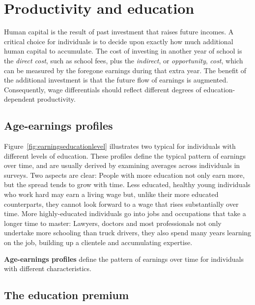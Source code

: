 \section{Productivity and education}\label{sec:ch13sec2}

Human capital is the result of past investment that raises future incomes. A
critical choice for individuals is to decide upon exactly how much
additional human capital to accumulate. The cost of investing in another
year of school is the \textit{direct cost}, such as school fees, plus the 
\textit{indirect}, or \textit{opportunity}, \textit{cost}, which can be measured by the
foregone earnings during that extra year. The benefit of the additional
investment is that the future flow of earnings is augmented. Consequently,
wage differentials should reflect different degrees of education-dependent
productivity.

\newhtmlpage

\subsection*{Age-earnings profiles}

Figure~\ref{fig:earningseducationlevel} illustrates two typical %
 for individuals with different levels of
education. These profiles define the typical pattern of earnings over time,
and are usually derived by examining averages across individuals in surveys.
Two aspects are clear: People with more education not only earn more, but
the spread tends to grow with time. Less educated, healthy young individuals
who work hard may earn a living wage but, unlike their more educated
counterparts, they cannot look forward to a wage that rises substantially
over time. More highly-educated individuals go into jobs and occupations
that take a longer time to master: Lawyers, doctors and most professionals
not only undertake more schooling than truck drivers, they also spend many
years learning on the job, building up a clientele and accumulating
expertise.

\begin{DefBox}
	\textbf{Age-earnings profiles} define the pattern of earnings over time for individuals with different characteristics.
\end{DefBox}





\newhtmlpage

\subsection*{The education premium}

